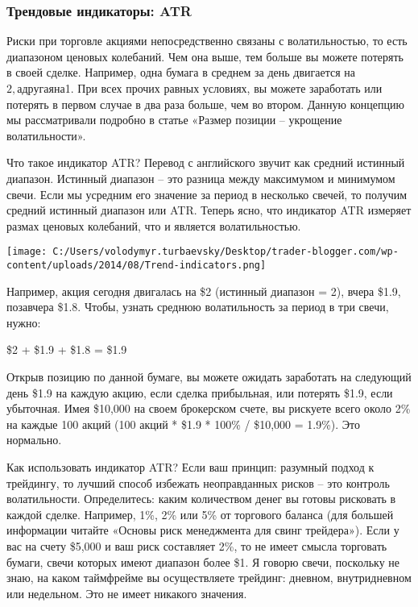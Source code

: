 \documentclass[a5paper]{article}
\begin{document}
\subsubsection{Трендовые индикаторы: ATR}

Риски при торговле акциями непосредственно связаны с волатильностью, то есть диапазоном ценовых колебаний. Чем она выше, тем больше вы можете потерять в своей сделке. Например, одна бумага в среднем за день двигается на $2, а другая на $1. При всех прочих равных условиях, вы можете заработать или потерять в первом случае в два раза больше, чем во втором. Данную концепцию мы рассматривали подробно в статье «Размер позиции – укрощение волатильности».

Что такое индикатор ATR? Перевод с английского звучит как средний
истинный диапазон. Истинный диапазон – это разница между максимумом и
минимумом свечи. Если мы усредним его значение за период в несколько
свечей, то получим средний истинный диапазон или ATR. Теперь ясно, что
индикатор ATR измеряет размах ценовых колебаний, что и является
волатильностью.

\texttt{[image: C:/Users/volodymyr.turbaevsky/Desktop/trader-blogger.com/wp-content/uploads/2014/08/Trend-indicators.png]}

Например, акция сегодня двигалась на \$2 (истинный диапазон = 2), вчера \$1.9, позавчера \$1.8. Чтобы, узнать среднюю волатильность за период в три свечи, нужно:

\$2 + \$1.9 + \$1.8 = \$1.9

Открыв позицию по данной бумаге, вы можете ожидать заработать на следующий день \$1.9 на каждую акцию, если сделка прибыльная, или потерять \$1.9, если убыточная. Имея \$10,000 на своем брокерском счете, вы рискуете всего около 2\% на каждые 100 акций (100 акций * \$1.9 * 100\% / \$10,000 = 1.9\%). Это нормально.

Как использовать индикатор ATR? Если ваш принцип: разумный подход к трейдингу, то лучший способ избежать неоправданных рисков – это контроль волатильности. Определитесь: каким количеством денег вы готовы рисковать в каждой сделке. Например, 1\%, 2\% или 5\% от торгового баланса (для большей информации читайте «Основы риск менеджмента для свинг трейдера»). Если у вас на счету \$5,000 и ваш риск составляет 2\%, то не имеет смысла торговать бумаги, свечи которых имеют диапазон более \$1. Я говорю свечи, поскольку не знаю, на каком таймфрейме вы осуществляете трейдинг: дневном, внутридневном или недельном. Это не имеет никакого значения.
\end{document}
